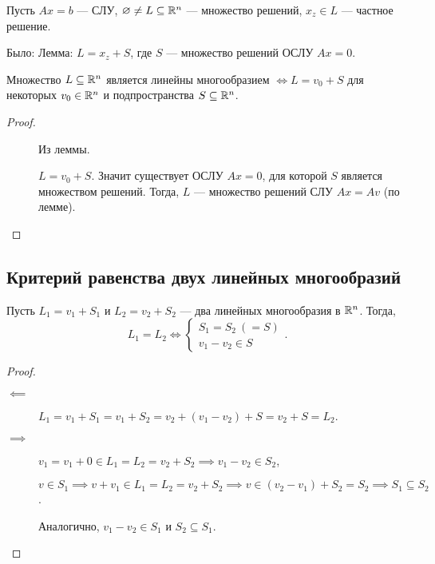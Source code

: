 Пусть $Ax = b$ --- СЛУ, $\varnothing \neq L \subseteq \mathbb{R}^n$ --- множество решений, $x_z \in L$ --- частное решение.

Было: Лемма: $L = x_z + S$, где $S$ --- множество решений ОСЛУ $Ax = 0$.

\begin{proposal}
    Множество $L \subseteq \mathbb{R}^n$ является линейны многообразием $\iff L = v_0 + S$ для некоторых $v_0 \in \mathbb{R}^n$ и подпространства $S \subseteq \mathbb{R}^n$. 
\end{proposal}

\begin{proof}~
    \begin{description}
    \item[\implies] Из леммы.
    \item[\impliedby] $L = v_0 + S$. Значит существует ОСЛУ $Ax = 0$, для которой $S$ является множеством решений. Тогда, $L$ --- множество решений СЛУ $Ax = Av$ (по лемме).
        \qedhere
    \end{description}
\end{proof}


\subsection{Критерий равенства двух линейных многообразий}

\begin{proposal}
    Пусть $L_1 = v_1 + S_1$ и $L_2 = v_2 + S_2$ --- два линейных многообразия в $\mathbb{R}^n$. Тогда,
    \begin{equation*}
        L_1 = L_2 \iff \begin{cases}
            S_1 = S_2 \ (= S) \\
            v_1 - v_2 \in S
        \end{cases}
    .\end{equation*}
\end{proposal}

\begin{proof}~
    \begin{description}
    \item[$\impliedby$] 
        $L_1 = v_1 + S_1 = v_1 + S_2 = v_2 + (v_1 - v_2) + S = v_2 + S = L_2$.
    \item[$\implies$]
        $v_1 = v_1 + 0 \in L_1 = L_2 = v_2 + S_2 \implies v_1 - v_2 \in S_2$,

        $v \in S_1 \implies v + v_1 \in L_1 = L_2 = v_2 + S_2 \implies v \in (v_2 - v_1) + S_2 = S_2 \implies S_1 \subseteq S_2$.

        Аналогично, $v_1 - v_2 \in S_1$ и $S_2 \subseteq S_1$.
        \qedhere
    \end{description}
\end{proof}


